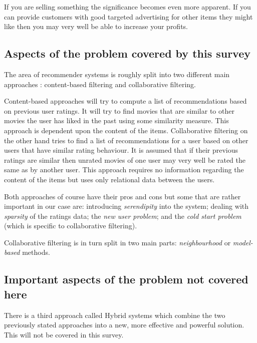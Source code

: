 \documentclass[a4paper,11pt]{article}
\begin{document}
If you are selling something the significance becomes even more apparent. If
you can provide customers with good targeted advertising for other items they might like then
you may very well be able to increase your profits.

\subsection{Aspects of the problem covered by this survey}
The area of recommender systems is roughly split into two different main approaches \cite{1423975}:
content-based filtering and collaborative filtering.

Content-based approaches will try to compute a list of recommendations based on previous user ratings.
It will try to find movies that are similar to other movies the user has liked in the past using some
similarity measure. This approach is dependent upon the content of the items. Collaborative filtering
on the other hand tries to find a list of recommendations for a user based on other users that have similar
rating behaviour. It is assumed that if their previous ratings are similar then unrated movies of one user
may very well be rated the same as by another user. This approach requires no information regarding the content
of the items but uses only relational data between the users.

Both approaches of course have their pros and cons but some that are rather important in our case are:
introducing \emph{serendipity} into the system; dealing with \emph{sparsity} of the ratings data; the
\emph{new user problem}; and the \emph{cold start problem} (which is specific to collaborative filtering).

Collaborative filtering is in turn split in two main parts: \emph{neighbourhood} or \emph{model-based} methods.

\subsection{Important aspects of the problem not covered here}
There is a third approach called Hybrid systems which combine the two previously stated approaches into a new,
more effective and powerful solution. This will not be covered in this survey.
\end{document}
